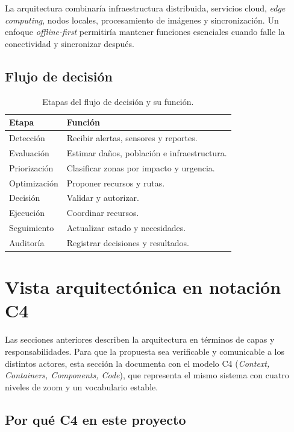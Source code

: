 \documentclass[11pt,a4paper]{article}
\begin{document}
La arquitectura combinaría infraestructura distribuida, servicios cloud,
\emph{edge computing}, nodos locales, procesamiento de imágenes y
sincronización. Un enfoque \emph{offline-first} permitiría mantener funciones
esenciales cuando falle la conectividad y sincronizar después.

\subsection{Flujo de decisión}

\begin{table}[htbp]
\centering
\caption{Etapas del flujo de decisión y su función.}
\label{tab:flujo}
\begin{tabularx}{0.9\textwidth}{@{}p{3.4cm}L@{}}
\toprule
\textbf{Etapa} & \textbf{Función} \\
\midrule
Detección     & Recibir alertas, sensores y reportes. \\
Evaluación    & Estimar daños, población e infraestructura. \\
Priorización  & Clasificar zonas por impacto y urgencia. \\
Optimización  & Proponer recursos y rutas. \\
Decisión      & Validar y autorizar. \\
Ejecución     & Coordinar recursos. \\
Seguimiento   & Actualizar estado y necesidades. \\
Auditoría     & Registrar decisiones y resultados. \\
\bottomrule
\end{tabularx}
\end{table}

\section{Vista arquitectónica en notación C4}

Las secciones anteriores describen la arquitectura en términos de capas y
responsabilidades. Para que la propuesta sea verificable y comunicable a los
distintos actores, esta sección la documenta con el modelo C4 (\emph{Context,
Containers, Components, Code}), que representa el mismo sistema con cuatro
niveles de zoom y un vocabulario estable.

\subsection{Por qué C4 en este proyecto}
\end{document}
